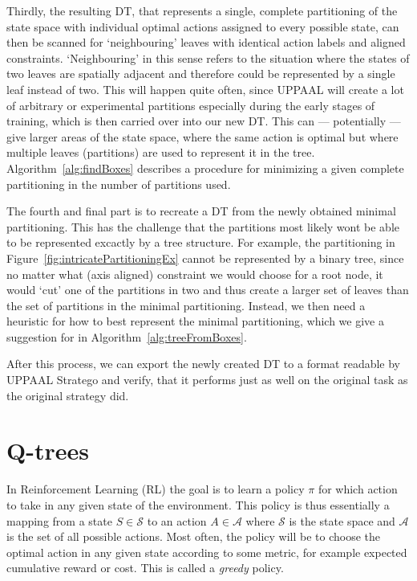 \documentclass{article}
\begin{document}
Thirdly, the resulting DT, that represents a single, complete partitioning of
the state space with individual optimal actions assigned to every possible
state, can then be scanned for `neighbouring' leaves with identical action
labels and aligned constraints. `Neighbouring' in this sense refers to the
situation where the states of two leaves are spatially adjacent and therefore
could be represented by a single leaf instead of two. This will happen quite
often, since UPPAAL will create a lot of arbitrary or experimental partitions
especially during the early stages of training, which is then carried over into
our new DT\@. This can --- potentially --- give larger areas of the state space,
where the same action is optimal but where multiple leaves (partitions) are used
to represent it in the tree. Algorithm~\ref{alg:findBoxes} describes a procedure
for minimizing a given complete partitioning in the number of partitions used.

The fourth and final part is to recreate a DT from the newly obtained
minimal partitioning. This has the challenge that the partitions most likely
wont be able to be represented excactly by a tree structure. For example, the
partitioning in Figure~\ref{fig:intricatePartitioningEx} cannot be represented
by a binary tree, since no matter what (axis aligned) constraint we would choose
for a root node, it would `cut' one of the partitions in two and thus create a
larger set of leaves than the set of partitions in the minimal partitioning.
Instead, we then need a heuristic for how to best represent the minimal
partitioning, which we give a suggestion for in
Algorithm~\ref{alg:treeFromBoxes}.

After this process, we can export the newly created DT to a format readable by
UPPAAL Stratego and verify, that it performs just as well on the original task
as the original strategy did.


\section{Q-trees}%
\label{sec:qTrees}


In Reinforcement Learning (RL) the goal is to learn a policy $\pi$ for which
action to take in any given state of the environment. This policy is thus
essentially a mapping from a state $S \in \mathcal{S}$ to an action $A \in
\mathcal{A}$ where $\mathcal{S}$ is the state space and $\mathcal{A}$ is the set
of all possible actions. Most often, the policy will be to choose the optimal
action in any given state according to some metric, for example expected
cumulative reward or cost. This is called a \textit{greedy} policy.
\end{document}
